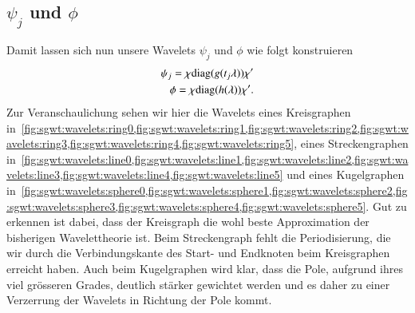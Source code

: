 \subsection{\texorpdfstring{$\psi_j$}{psi} und \texorpdfstring{$\phi$}{phi}}
Damit lassen sich nun unsere Wavelets $\psi_j$ und $\phi$ wie folgt konstruieren
\begin{align}
\psi_j = \chi \diag{g(t_j\lambda)} \chi' 
\label{eq:sgwt:psi}
\\
\phi = \chi \diag{h(\lambda)} \chi'.
\label{eq:sgwt:phi}
\end{align}
Zur Veranschaulichung sehen wir hier die Wavelets eines Kreisgraphen 
in~\cref{fig:sgwt:wavelets:ring0,fig:sgwt:wavelets:ring1,fig:sgwt:wavelets:ring2,fig:sgwt:wavelets:ring3,fig:sgwt:wavelets:ring4,fig:sgwt:wavelets:ring5},
 eines Streckengraphen 
in~\cref{fig:sgwt:wavelets:line0,fig:sgwt:wavelets:line1,fig:sgwt:wavelets:line2,fig:sgwt:wavelets:line3,fig:sgwt:wavelets:line4,fig:sgwt:wavelets:line5}
 und eines Kugelgraphen 
in~\cref{fig:sgwt:wavelets:sphere0,fig:sgwt:wavelets:sphere1,fig:sgwt:wavelets:sphere2,fig:sgwt:wavelets:sphere3,fig:sgwt:wavelets:sphere4,fig:sgwt:wavelets:sphere5}.
Gut zu erkennen ist dabei, dass der Kreisgraph die wohl beste Approximation der 
bisherigen Wavelettheorie ist. Beim Streckengraph fehlt die Periodisierung, die 
wir durch die Verbindungskante des Start- und Endknoten beim Kreisgraphen 
erreicht haben. Auch beim Kugelgraphen wird klar, dass die Pole, aufgrund ihres 
viel gr\"osseren Grades, deutlich st\"arker gewichtet werden und es daher zu 
einer Verzerrung der Wavelets in Richtung der Pole kommt.

